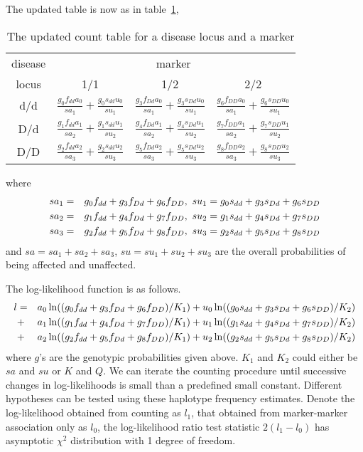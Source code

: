 The updated table is now as in table~\ref{twotwou},

\begin{table}[h]
\centering
\caption{The updated count table for a disease locus and a marker\label{twotwou}}
\vskip 0.3cm
\begin{tabular}{cccc}
\hline
disease & \multicolumn{3}{c}{marker}\\ \cline{2-4}
locus &   1/1 & 1/2 & 2/2 \\
\hline
d/d  &   $\frac{g_{0} f_{dd}a_{0}}{sa_1} + \frac{g_{0} s_{dd}u_{0}}{su_1}$&
         $\frac{g_{3} f_{Dd}a_{0}}{sa_1} + \frac{g_{3} s_{Dd}u_{0}}{su_1}$&
         $\frac{g_{6} f_{DD}a_{0}}{sa_1} + \frac{g_{6} s_{DD}u_{0}}{su_1}$\\
D/d  &   $\frac{g_{1} f_{dd}a_{1}}{sa_2} + \frac{g_{1} s_{dd}u_{1}}{su_2}$&
         $\frac{g_{4} f_{Dd}a_{1}}{sa_2} + \frac{g_{4} s_{Dd}u_{1}}{su_2}$&
         $\frac{g_{7} f_{DD}a_{1}}{sa_2} + \frac{g_{7} s_{DD}u_{1}}{su_2}$\\
D/D  &   $\frac{g_{2} f_{dd}a_{2}}{sa_3} + \frac{g_{2} s_{dd}u_{2}}{su_3}$&
         $\frac{g_{5} f_{Dd}a_{2}}{sa_3} + \frac{g_{5} s_{Dd}u_{2}}{su_3}$&
         $\frac{g_{8} f_{DD}a_{2}}{sa_3} + \frac{g_{8} s_{DD}u_{2}}{su_3}$\\
\hline
\end{tabular}
\end{table}

where
\begin{eqnarray*}
  sa_1&=&g_{0} f_{dd}+g_{3} f_{Dd}+g_{6} f_{DD},\ su_1 = g_{0} s_{dd}+g_{3} s_{Dd}+g_{6} s_{DD} \cr
  sa_2&=&g_{1} f_{dd}+g_{4} f_{Dd}+g_{7} f_{DD},\ su_2 = g_{1} s_{dd}+g_{4} s_{Dd}+g_{7} s_{DD} \cr
  sa_3&=&g_{2} f_{dd}+g_{5} f_{Dd}+g_{8} f_{DD},\ su_3 = g_{2} s_{dd}+g_{5} s_{Dd}+g_{8} s_{DD}
\end{eqnarray*}
and $sa=sa_1+sa_2+sa_3$, $su=su_1+su_2+su_3$ are the overall probabilities of
being affected and unaffected.

The log-likelihood function is as follows.
\begin{eqnarray*}
l&=&  a_{0}\ln ((g_{0} f_{dd}+g_{3} f_{Dd}+g_{6} f_{DD})/K_1)
     +u_{0}\ln ((g_{0} s_{dd}+g_{3} s_{Dd}+g_{6} s_{DD})/K_2) \cr
 &+&  a_{1}\ln ((g_{1} f_{dd}+g_{4} f_{Dd}+g_{7} f_{DD})/K_1)
     +u_{1}\ln ((g_{1} s_{dd}+g_{4} s_{Dd}+g_{7} s_{DD})/K_2) \cr
 &+&  a_{2}\ln ((g_{2} f_{dd}+g_{5} f_{Dd}+g_{8} f_{DD})/K_1)
     +u_{2}\ln ((g_{2} s_{dd}+g_{5} s_{Dd}+g_{8} s_{DD})/K_2)
\end{eqnarray*}
where $g$'s are the genotypic probabilities given above.  $K_1$ and $K_2$ could
either be $sa$ and $su$ or $K$ and $Q$.  We can iterate the counting procedure
until successive changes in log-likelihoods is small than a predefined small
constant.  Different hypotheses can be tested using these haplotype frequency
estimates.  Denote the log-likelihood obtained from counting as $l_1$, that
obtained from marker-marker association only as $l_0$, the log-likelihood ratio
test statistic $2(l_1-l_0)$ has asymptotic $\chi^2$ distribution with 1 degree
of freedom.


